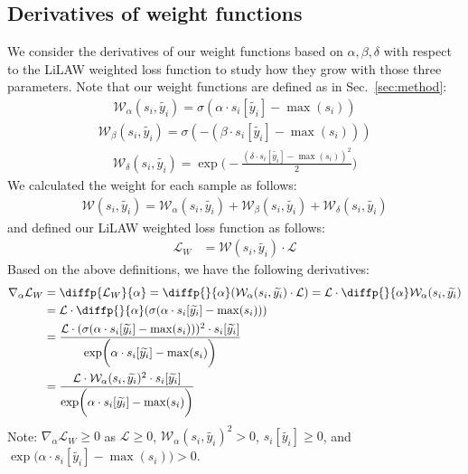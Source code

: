 \documentclass{article}
\theoremstyle{plain}
\theoremstyle{definition}
\theoremstyle{remark}
\begin{document}
\subsection{Derivatives of weight functions}
\label{supp:derivative}

We consider the derivatives of our weight functions based on $\alpha, \beta, \delta$ with respect to the LiLAW weighted loss function to study how they grow with those three parameters. Note that our weight functions are defined as in Sec.~\ref{sec:method}:
\begin{align}
    \mathcal{W}_\alpha (s_i, \widetilde{y_i}) = \sigma(\alpha \cdot s_i[\widetilde{y_i}] - \max(s_i))\nonumber
\end{align}
\begin{align}
    \mathcal{W}_\beta (s_i, \widetilde{y_i}) = \sigma(-(\beta \cdot s_i[\widetilde{y_i}] - \max(s_i)))\nonumber
\end{align}
\begin{align}
    \mathcal{W}_\delta (s_i, \widetilde{y_i}) = \exp\biggl(-\frac{(\delta \cdot s_i[\widetilde{y_i}] - \max(s_i))^2}{2}\biggr)\nonumber
\end{align}
\noindent We calculated the weight for each sample as follows:
\begin{align}
    \mathcal{W}(s_i, \widetilde{y_i}) = \mathcal{W}_\alpha (s_i, \widetilde{y_i}) + \mathcal{W}_\beta (s_i, \widetilde{y_i}) + \mathcal{W}_\delta (s_i, \widetilde{y_i})\nonumber
\end{align}
\noindent and defined our LiLAW weighted loss function as follows:
\begin{align}
\mathcal{L}_{W} &= \mathcal{W}(s_i, \widetilde{y_i}) \cdot \mathcal{L}\nonumber
\end{align}
\noindent Based on the above definitions, we have the following derivatives:
\begin{align}
    \nabla_{\alpha}\mathcal{L}_{W} &= \diffp{\mathcal{L}_{W}}{\alpha} = \diffp{}{\alpha} (\mathcal{W}_\alpha (s_i, \widetilde{y_i}) \cdot \mathcal{L}) \nonumber = \mathcal{L} \cdot \diffp{}{\alpha} \mathcal{W}_\alpha (s_i, \widetilde{y_i}) \nonumber \\ &= \mathcal{L} \cdot \diffp{}{\alpha} (\sigma(\alpha \cdot s_i[\widetilde{y_i}] - \max(s_i))) \nonumber \\ &= \frac{\mathcal{L} \cdot (\sigma(\alpha \cdot s_i[\widetilde{y_i}] - \max(s_i)))^2 \cdot s_i[\widetilde{y_i}]}{\exp\biggl(\alpha \cdot s_i[\widetilde{y_i}] - \max(s_i)\biggl)}\nonumber \\ &= \frac{\mathcal{L} \cdot \mathcal{W}_\alpha (s_i, \widetilde{y_i})^2 \cdot s_i[\widetilde{y_i}]}{\exp\biggl(\alpha \cdot s_i[\widetilde{y_i}] - \max(s_i)\biggl)}\nonumber
\end{align}
\noindent Note: $\nabla_{\alpha}\mathcal{L}_{W} \geq 0$ as $\mathcal{L} \geq 0$, $\mathcal{W}_\alpha (s_i, \widetilde{y_i})^2 > 0$, $s_i[\widetilde{y_i}] \geq 0$, and $\exp\biggl(\alpha \cdot s_i[\widetilde{y_i}] - \max(s_i)\biggl) > 0$.
\end{document}
